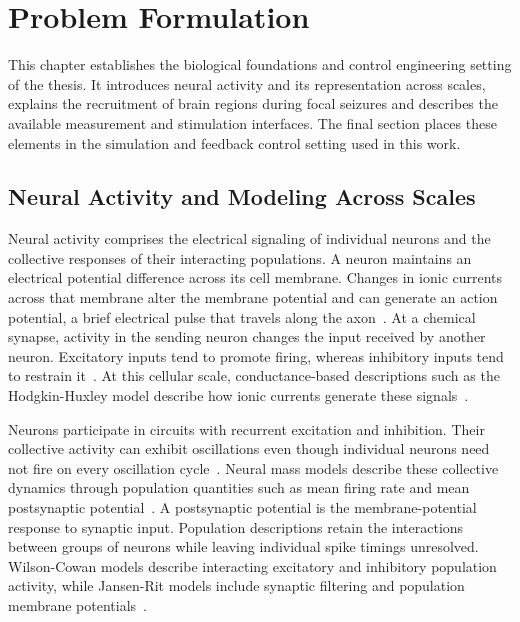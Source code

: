 \chapter{Problem Formulation}
\label{ch:problem_formulation}

This chapter establishes the biological foundations and control engineering setting of the thesis.
It introduces neural activity and its representation across scales, explains the recruitment of brain regions during focal seizures and describes the available measurement and stimulation interfaces.
The final section places these elements in the simulation and feedback control setting used in this work.

\section{Neural Activity and Modeling Across Scales}
\label{sec:neural_activity_background}

Neural activity comprises the electrical signaling of individual neurons and the collective responses of their interacting populations.
A neuron maintains an electrical potential difference across its cell membrane.
Changes in ionic currents across that membrane alter the membrane potential and can generate an action potential, a brief electrical pulse that travels along the axon~\cite{Hodgkin1952}.
At a chemical synapse, activity in the sending neuron changes the input received by another neuron.
Excitatory inputs tend to promote firing, whereas inhibitory inputs tend to restrain it~\cite{Wilson1972}.
At this cellular scale, conductance-based descriptions such as the Hodgkin-Huxley model describe how ionic currents generate these signals~\cite{Hodgkin1952}.

Neurons participate in circuits with recurrent excitation and inhibition.
Their collective activity can exhibit oscillations even though individual neurons need not fire on every oscillation cycle~\cite{Buzsaki2012}.
Neural mass models describe these collective dynamics through population quantities such as mean firing rate and mean postsynaptic potential~\cite{SanzLeon2013}.
A postsynaptic potential is the membrane-potential response to synaptic input.
Population descriptions retain the interactions between groups of neurons while leaving individual spike timings unresolved.
Wilson-Cowan models describe interacting excitatory and inhibitory population activity, while Jansen-Rit models include synaptic filtering and population membrane potentials~\cite{Wilson1972,Jansen1995}.

